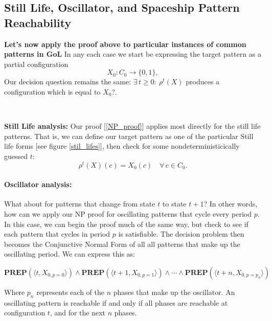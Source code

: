 \documentclass{article}
\theoremstyle{definition}
\theoremstyle{plain}
\theoremstyle{plain}
\begin{document}
\subsection{Still Life, Oscillator, and Spaceship Pattern Reachability}

\textbf{Let's now apply the proof above to particular instances of common patterns in GoL}
In any each case we start be expressing the target pattern as a partial configuration
\begin{equation}
  X_0 \colon C_0 \to \{0,1\},
\end{equation}
Our decision question remains the same: $\exists\,t\ge0:\ \rho^t(X)$ produces a configuration which is equal to $X_0$?.

\
\

\textbf{Still Life analysis:}
Our proof [\ref{NP_proof}] applies most directly for the still life patterns. That is, we can define our target pattern as one of the particular Still life forms [see figure \ref{stil_lifes}], then check for some nondeterministicically guessed $t$: 
\begin{equation}
  \rho^t(X)(c) = X_0(c)\quad\forall\,c\in C_0.
\end{equation}

\paragraph{Oscillator analysis:} 
What about for patterns that change from state $t$ to state $t+1$? In other words, how can we apply our NP proof for oscillating patterns that cycle every period $p$. In this case, we can begin the proof much of the same way, but check to see if each pattern that cycles in period $p$ is satisfiable. The decision problem then becomes the Conjunctive Normal Form of all all patterns that make up the oscillating period. We can express this as:


\begin{equation}
\textbf{PREP}(\langle t, X_{0,p=0} \rangle) \land \textbf{PREP}(\langle t+1, X_{0,p=1} \rangle) \land \cdots \land \textbf{PREP}(\langle t+n, X_{0,p=p_n} \rangle)
\end{equation}

Where $p_n$ represents each of the $n$ phases that make up the oscillator. An oscillating pattern is reachable if and only if all phases are reachable at configuration $t$, and for the next $n$ phases.

\
\
\end{document}
